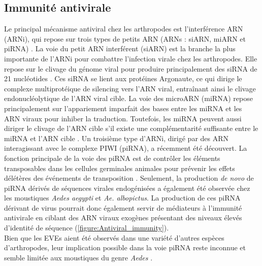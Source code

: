 \subsection{Immunité antivirale}

 Le principal mécanisme antiviral chez les arthropodes est l'interférence ARN (ARNi), qui repose sur trois types de petits ARN (ARNs : siARN, miARN et piRNA) \citep{obbard_evolution_2009}. La voie du petit ARN interférent (siARN) est la branche la plus importante de l'ARNi pour combattre l'infection virale chez les arthropodes. Elle repose sur le clivage du génome viral pour produire principalement des siRNA de 21 nucléotides \citep{obbard_evolution_2009}. Ces siRNA se lient aux protéines Argonaute, ce qui dirige le complexe multiprotéique de silencing vers l'ARN viral, entraînant ainsi le clivage endonucléolytique de l'ARN viral cible. La voie des microARN (miRNA) repose principalement sur l'appariement imparfait des bases entre les miRNA et les ARN viraux pour inhiber la traduction. Toutefois, les miRNA peuvent aussi diriger le clivage de l'ARN cible s'il existe une complémentarité suffisante entre le miRNA et l'ARN cible \citep{obbard_evolution_2009}. Un troisième type d'ARNi, dirigé par des ARN interagissant avec le complexe PIWI (piRNA), a récemment été découvert. La fonction principale de la voie des piRNA est de contrôler les éléments transposables dans les cellules germinales animales pour prévenir les effets délétères des événements de transposition \citep{cosby_hosttransposon_2019}. Seulement, la production \textit{de novo} de piRNA dérivés de séquences virales endogénisées a également été observée chez les moustiques \textit{Aedes aegypti} et \textit{Ae. albopictus}. La production de ces piRNA dérivant de virus pourrait donc également servir de médiateurs à l'immunité antivirale en ciblant des ARN viraux exogènes présentant des niveaux élevés d'identité de séquence\citep{miesen_piwis_2016} (\figurename{\ref{figure:Antiviral_immunity}}).\\

Bien que les EVEs aient été observés dans une variété d'autres espèces d'arthropodes, leur implication possible dans la voie piRNA reste inconnue et semble limitée aux moustiques du genre \textit{Aedes} \citep{ter_horst_endogenous_2019, cerqueira_de_araujo_transposable_2022}.\newpage

